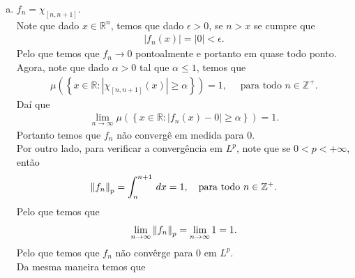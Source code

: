 \begin{homeworkProblem}[6]
\begin{solution}
\begin{enumerate}[a)]
        Pelo que tampouco temos convergência em $L^{1}$.\\
        Agora, se $p>1$, temos que $\frac{1}{p}-1<0$ e portanto
        \begin{align*}
          \lim_{n \to \infty}\norm{f_n}_p=\lim_{n \to \infty}n^{\frac{1}{p}-1}=0.
        \end{align*}
        Onde temos que $f_n\to 0$ em $L^{p}$.\\
        Por último, note que
        \begin{align*}
          \lim_{n \to \infty}\norm{f_n}_{\infty}=\lim_{n \to \infty}n^{-1}=0.
        \end{align*}
        Pelo que temos que $f_n\to 0$ em $L^{\infty}$. 
      \item $f_n=\chi_{[n,n+1]}$.\\
        Note que dado $x\in \mathbb{R}^{n}$, temos que dado $\epsilon>0$, se $n>x$ se cumpre que
        \begin{align*}
          |f_n(x)|=|0|<\epsilon.
        \end{align*}
        Pelo que temos que $f_n\to 0$ pontoalmente e portanto em quase todo ponto.
        Agora, note que dado $\alpha>0$ tal que $\alpha\leq 1$, temos que
        \begin{align*}
          \mu\left( \left\{ x\in\mathbb{R}: |\chi_{[n,n+1]}(x)|\geq \alpha \right\} \right)=1,\quad\text{ para todo }n\in\mathbb{Z}^{+}.
        \end{align*}
        Daí que
        \begin{align*}
          \lim_{n \to \infty}\mu\left( \left\{ x\in\mathbb{R}:|f_n(x)-0|\geq \alpha \right\} \right)=1.
        \end{align*}
        Portanto temos que $f_n$ não convergê em medida para $0$.\\
        Por outro lado, para verificar a convergência em $L^{p}$, note que se $0<p<+\infty$, então
        \begin{align*}
          \left\|f_n\right\|_p=\int_{n}^{n+1}\,dx=1,\quad\text{para todo }n\in\mathbb{Z}^{+}.
        \end{align*}
        Pelo que temos que
        \begin{align*}
          \lim_{n \to \infty}\left\|f_n\right\|_p=\lim_{n \to \infty}1=1.
        \end{align*}
        Pelo que temos que $f_n$ não convêrge para $0$ em $L^{p}$.\\
        Da mesma maneira temos que
        \begin{align*}

\end{align*}
\end{enumerate}
\end{solution}
\end{homeworkProblem}
